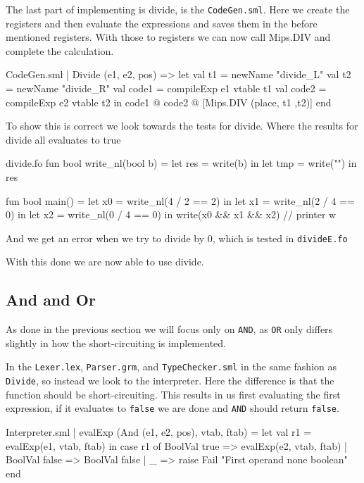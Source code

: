 \documentclass[11pt,a4paper,oneside]{report}
\begin{document}
The last part of implementing is divide, is the \texttt{CodeGen.sml}.
Here we create the registers and then evaluate the expressions and saves them in the before mentioned registers. With those to registers we can now call Mips.DIV and complete the calculation.
\begin{code}[firstnumber=251]{CodeGen.sml}
  | Divide (e1, e2, pos) =>
      let val t1 = newName "divide_L"
          val t2 = newName "divide_R"
          val code1 = compileExp e1 vtable t1
          val code2 = compileExp e2 vtable t2
      in  code1 @ code2 @ [Mips.DIV (place, t1 ,t2)]
      end
\end{code}
To show this is correct we look towards the tests for divide. Where the results for divide all evaluates to true
\begin{code}{divide.fo}
fun bool write_nl(bool b) =
  let res = write(b) in
  let tmp = write("\n") in
  res

fun bool main() =
    let x0 = write_nl(4 / 2 == 2) in
    let x1 = write_nl(2 / 4 == 0) in
    let x2 = write_nl(0 / 4 == 0) in
    write(x0 && x1 && x2)         //  printer w
\end{code}
And we get an error when we try to divide by 0, which is tested in \texttt{divideE.fo}

With this done we are now able to use divide.

\subsection*{And and Or}
As done in the previous section we will focus only on \texttt{AND}, as \texttt{OR} only differs slightly in how the short-circuiting is implemented.

In the \texttt{Lexer.lex}, \texttt{Parser.grm}, and \texttt{TypeChecker.sml} in the same fashion as \texttt{Divide}, so instead we look to the interpreter. Here the difference is that the function should be short-circuiting.
This results in us first evaluating the first expression, if it evaluates to \texttt{false} we are done and \texttt{AND} should return \texttt{false}.
\begin{code}[firstnumber=182]{Interpreter.sml}
| evalExp (And (e1, e2, pos), vtab, ftab) =
        let val r1 = evalExp(e1, vtab, ftab)
        in case r1 of
               BoolVal true => evalExp(e2, vtab, ftab)
             | BoolVal false  => BoolVal false
             | _ => raise Fail "First operand none boolean"
        end
\end{code}
\end{document}
